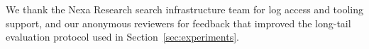 \begin{acks}
We thank the Nexa Research search infrastructure team for log access and tooling support,
and our anonymous reviewers for feedback that improved the long-tail evaluation protocol
used in Section~\ref{sec:experiments}.
\end{acks}
